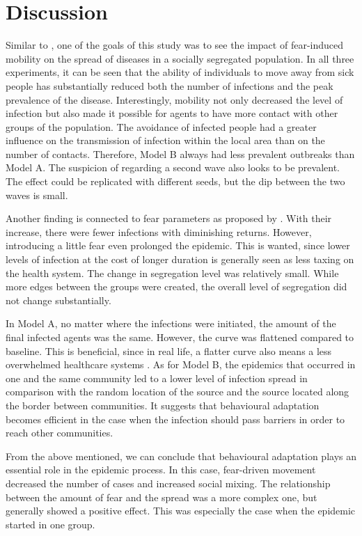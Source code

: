 \documentclass[11pt,a4paper]{article}
\begin{document}
\FloatBarrier
\section{Discussion}

Similar to \citet{epstein2008coupled}, one of the goals of this study was to see the impact of fear-induced mobility on the spread of diseases in a socially segregated population. In all three experiments, it can be seen that the ability of individuals to move away from sick people has substantially reduced both the number of infections and the peak prevalence of the disease.
Interestingly, mobility not only decreased the level of infection but also made it possible for agents to have more contact with other groups of the population. The avoidance of infected people had a greater influence on the transmission of infection within the local area than on the number of contacts. Therefore, Model B always had less prevalent outbreaks than Model A.
The suspicion of \citet{panicker2024social} regarding a second wave also looks to be prevalent. The effect could be replicated with different seeds, but the dip between the two waves is small.

Another finding is connected to fear parameters as proposed by \citet{bagnoli2007risk}. With their increase, there were fewer infections with diminishing returns. However, introducing a little fear even prolonged the epidemic. This is wanted, since lower levels of infection at the cost of longer duration is generally seen as less taxing on the health system.
The change in segregation level was relatively small. While more edges between the groups were created, the overall level of segregation did not change substantially.

In Model A, no matter where the infections were initiated, the amount of the final infected agents was the same. However, the curve was flattened compared to baseline. This is beneficial, since in real life, a flatter curve also means a less overwhelmed healthcare systems \citep{feng2020benefits}.
As for Model B, the epidemics that occurred in one and the same community led to a lower level of infection spread in comparison with the random location of the source and the source located along the border between communities. It suggests that behavioural adaptation becomes efficient in the case when the infection should pass barriers in order to reach other communities.

From the above mentioned, we can conclude that behavioural adaptation plays an essential role in the epidemic process. In this case, fear-driven movement decreased the number of cases and increased social mixing. The relationship between the amount of fear and the spread was a more complex one, but generally showed a positive effect. This was especially the case when the epidemic started in one group.
\end{document}
